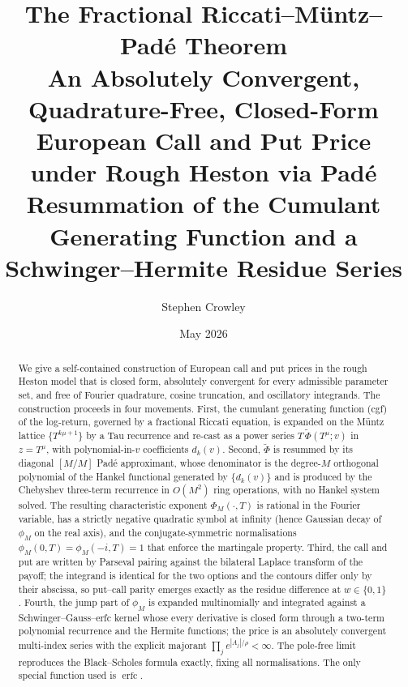 \documentclass[11pt]{article}
\DeclareMathOperator{\erfc}{erfc}
\begin{document}
\title{The Fractional Riccati--M\"untz--Pad\'{e} Theorem\\[2pt]
\large An Absolutely Convergent, Quadrature-Free, Closed-Form
European Call and Put Price under Rough Heston via Pad\'{e}
Resummation of the Cumulant Generating Function and a
Schwinger--Hermite Residue Series}
\author{Stephen Crowley}
\date{May 2026}
\maketitle

\begin{abstract}
We give a self-contained construction of European call and put prices in
the rough Heston model that is closed form, absolutely convergent for every
admissible parameter set, and free of Fourier quadrature, cosine
truncation, and oscillatory integrands. The construction proceeds in four
movements. First, the cumulant generating function (cgf) of the log-return,
governed by a fractional Riccati equation, is expanded on the M\"untz
lattice $\{T^{k\mu+1}\}$ by a Tau recurrence and re-cast as a power series
$T\,\widetilde\Phi(T^{\mu};v)$ in $z=T^{\mu}$, with polynomial-in-$v$
coefficients $d_k(v)$. Second, $\widetilde\Phi$ is resummed by its diagonal
$[M/M]$ Pad\'{e} approximant, whose denominator is the degree-$M$ orthogonal
polynomial of the Hankel functional generated by $\{d_k(v)\}$ and is
produced by the Chebyshev three-term recurrence in $O(M^2)$ ring operations,
with no Hankel system solved. The resulting characteristic exponent
$\Phi_M(\cdot,T)$ is rational in the Fourier variable, has a strictly
negative quadratic symbol at infinity (hence Gaussian decay of $\phi_M$ on
the real axis), and the conjugate-symmetric normalisations
$\phi_M(0,T)=\phi_M(-i,T)=1$ that enforce the martingale property. Third,
the call and put are written by Parseval pairing against the bilateral
Laplace transform of the payoff; the integrand is identical for the two
options and the contours differ only by their abscissa, so put--call parity
emerges exactly as the residue difference at $w\in\{0,1\}$. Fourth, the jump
part of $\phi_M$ is expanded multinomially and integrated against a
Schwinger--Gauss--erfc kernel whose every derivative is closed form through
a two-term polynomial recurrence and the Hermite functions; the price is an
absolutely convergent multi-index series with the explicit majorant
$\prod_j e^{|A_j|/\rho}<\infty$. The pole-free limit reproduces the
Black--Scholes formula exactly, fixing all normalisations. The only special
function used is $\erfc$.
\end{abstract}
\end{document}
